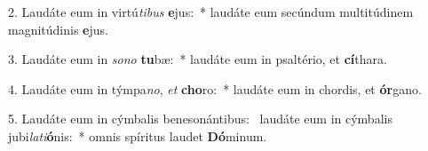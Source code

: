 2. Laudáte eum in virtú\textit{ti}\textit{bus} \textbf{e}jus:~*  laudáte eum secúndum multitúdinem magnitúdinis \textbf{e}jus.\

3. Laudáte eum in \textit{so}\textit{no} \textbf{tu}bæ:~*  laudáte eum in psaltério, et \textbf{cí}thara.\

4. Laudáte eum in týmpa\textit{no}, \textit{et} \textbf{cho}ro:~*  laudáte eum in chordis, et \textbf{ór}gano.\

5. Laudáte eum in cýmbalis benesonántibus: \dag\  laudáte eum in cýmbalis jubi\textit{la}\textit{ti}\textbf{ó}nis:~*  omnis spíritus laudet \textbf{Dó}minum.\

